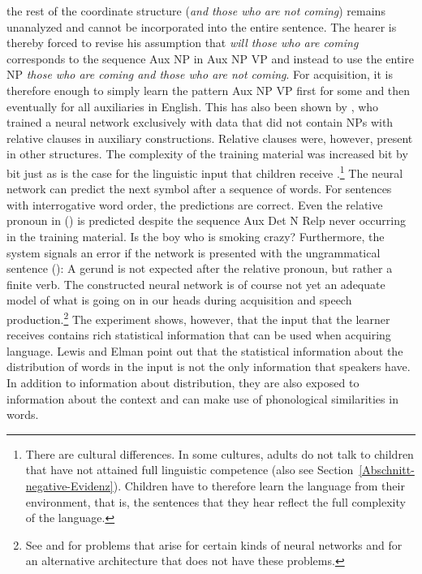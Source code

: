 the rest of the coordinate structure (\emph{and those who are not coming}) remains unanalyzed and cannot be incorporated into the entire sentence.
The hearer is thereby forced to revise his assumption that \emph{will those who are coming} corresponds to the sequence Aux NP in Aux NP VP and instead to
use the entire NP \emph{those who are coming and those who are not coming}.
For acquisition, it is therefore enough to simply learn the pattern Aux NP VP first for some and then eventually for all auxiliaries in English.
This has also been shown by \citet{LE2001a}, who trained a neural network exclusively with data that did not contain NPs with relative
clauses in auxiliary constructions. Relative clauses were, however, present in other structures. The complexity of the training material was increased bit
by bit just as is the case for the linguistic input that children receive
\citep{Elman93a}.\footnote{
	There are cultural differences. In some cultures, adults do not talk to children that have not attained
	full linguistic competence \citep{Ochs82a,OS85a} (also see
  Section~\ref{Abschnitt-negative-Evidenz}). Children have to therefore learn the language from their environment, that is, the sentences that
  they hear reflect the full complexity of the language.
} The neural network can predict the next symbol after a sequence of words. For sentences with interrogative word order, the predictions are correct.
Even the relative pronoun in () is predicted despite the sequence Aux Det N Relp never occurring in the training material.
\ea
Is the boy who is smoking crazy?
\z
Furthermore, the system signals an error if the network is presented with the ungrammatical sentence ():
\z
A gerund is not expected after the relative pronoun, but rather a finite verb. The constructed neural network is of course not yet an adequate model of what is
going on in our heads during acquisition and speech production.\footnote{
  See \citet[]{Hurford2002a} and \citet[Section~6.2]{Jackendoff2007a} for problems that arise for certain kinds of neural
  networks and \citet{Pulvermueller2003a,Pulvermueller2010a} for an alternative
  architecture that does not have these problems.
} The experiment shows, however, that the input that the learner receives contains rich statistical information that can be
used when acquiring language. Lewis and Elman point out that the statistical information about the distribution of words in the input
is not the only information that speakers have. In addition to information about distribution, they are also exposed to information about the context
and can make use of phonological similarities in words.

